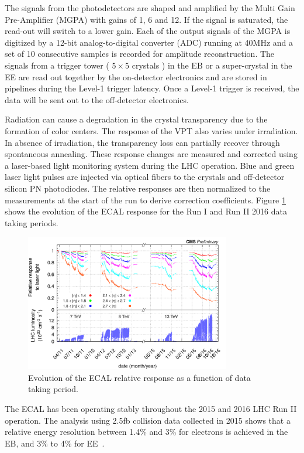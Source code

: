 \documentclass[thesis.tex]{subfiles}
\begin{document}
The signals from the photodetectors are shaped and amplified by the Multi Gain Pre-Amplifier (MGPA) with gains of 1, 6 and 12. 
If the signal is saturated, the read-out will switch to a lower gain. 
Each of the output signals of the MGPA is digitized by a 12-bit analog-to-digital converter (ADC) running at 40MHz and a set of 10 consecutive samples is recorded for amplitude reconstruction.
The signals from a trigger tower ( $5\times5$ crystals ) in the EB or a super-crystal in the EE are read out together by the on-detector electronics and are stored in pipelines during the Level-1 trigger latency. 
Once a Level-1 trigger is received, the data will be sent out to the off-detector electronics. 

Radiation can cause a degradation in the crystal transparency due to the formation of color centers. 
The response of the VPT also varies under irradiation. 
In absence of irradiation, the transparency loss can partially recover through spontaneous annealing. 
These response changes are measured and corrected using a laser-based light monitoring system during the LHC operation. 
Blue and green laser light pulses are injected via optical fibers to the crystals and off-detector silicon PN photodiodes. 
The relative responses are then normalized to the measurements at the start of the run to derive correction coefficients. 
Figure \ref{fig:lasermonitor} shows the evolution of the ECAL response for the Run I and Run II 2016 data taking periods. 

\begin{figure}[hbtp]
	\centering
	\includegraphics[width=0.8\textwidth]{Fig/lasermonitor.png}
	\caption{Evolution of the ECAL relative response as a function of data taking period.} 
	\label{fig:lasermonitor}
\end{figure}

The ECAL has been operating stably throughout the 2015 and 2016 LHC Run II operation.
The analysis using 2.5fb collision data collected in 2015 shows that a relative energy resolution
between 1.4\% and 3\% for electrons is achieved in the EB, and 3\% to 4\% for EE~\cite{Sun:2233637}. 
\end{document}
